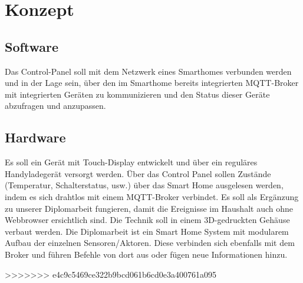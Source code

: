 \chapter{Konzept}
    \section{Software}
        Das Control-Panel soll mit dem Netzwerk eines Smarthomes
        verbunden werden und in der Lage sein, über den im Smarthome 
        bereits integrierten MQTT-Broker mit integrierten Geräten zu 
        kommunizieren und den Status dieser Geräte abzufragen und anzupassen.


    \section{Hardware}
        Es soll ein Gerät mit Touch-Display entwickelt und über ein reguläres 
        Handyladegerät versorgt werden. Über das Control Panel sollen Zustände 
        (Temperatur, Schalterstatus, usw.) über das Smart Home ausgelesen werden, 
        indem es sich drahtlos mit einem MQTT-Broker verbindet. Es soll als 
        Ergänzung zu unserer Diplomarbeit fungieren, damit die Ereignisse im 
        Haushalt auch ohne Webbrowser ersichtlich sind. Die Technik soll in
        einem 3D-gedruckten Gehäuse verbaut werden. Die Diplomarbeit ist ein 
        Smart Home System mit modularem Aufbau der einzelnen Sensoren/Aktoren. 
        Diese verbinden sich ebenfalls mit dem Broker und führen Befehle
        von dort aus oder fügen neue Informationen hinzu.
        
        
>>>>>>> e4c9c5469ce322b9bcd061b6cd0e3a400761a095
